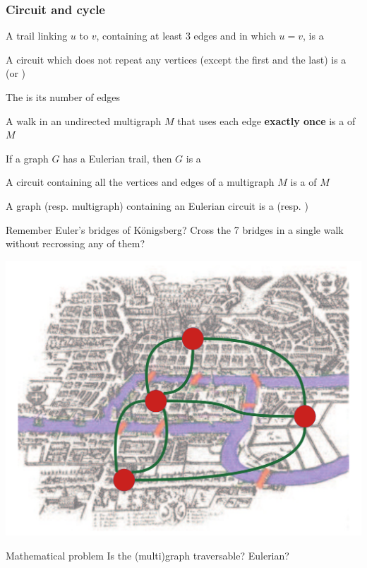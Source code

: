 \documentclass[aspectratio=169]{beamer}\usepackage[]{graphicx}\usepackage[]{xcolor}
\begin{document}
\begin{frame}\frametitle{Circuit and cycle}
\begin{definition}[Circuit]
A trail linking $u$ to $v$, containing at least 3 edges and in which $u=v$, is a 
\end{definition}
\vfill
\begin{definition}[Cycle]\label{def:cycle}
A circuit which does not repeat any vertices (except the first and the last) is a  (or )
\end{definition}
\vfill
\begin{definition}
The  is its number of edges
\end{definition}
\end{frame}


\begin{frame}
\begin{definition}
	A walk in an undirected multigraph $M$ that uses each edge \textbf{exactly once} is a  of $M$
\end{definition}
\vfill
\begin{definition}
	If a graph $G$ has a Eulerian trail, then $G$ is a 
\end{definition}
\vfill
\begin{definition}
	A circuit containing all the vertices and edges of a multigraph $M$ is a  of $M$
\end{definition}
\vfill
\begin{definition}
	A graph (resp. multigraph) containing an Eulerian circuit is a  (resp. )
\end{definition}
\end{frame}

\begin{frame}{Remember Euler's bridges of K\"onigsberg?}
	Cross the 7 bridges in a single walk without recrossing any of them?
	\begin{center}
	\includegraphics[width=.7\textwidth]{FIGS_slides/bridge_color_with_graph}
	\end{center}
	\begin{block}{Mathematical problem}
		Is the (multi)graph traversable? Eulerian?
	\end{block}
	\end{frame}
\end{document}
